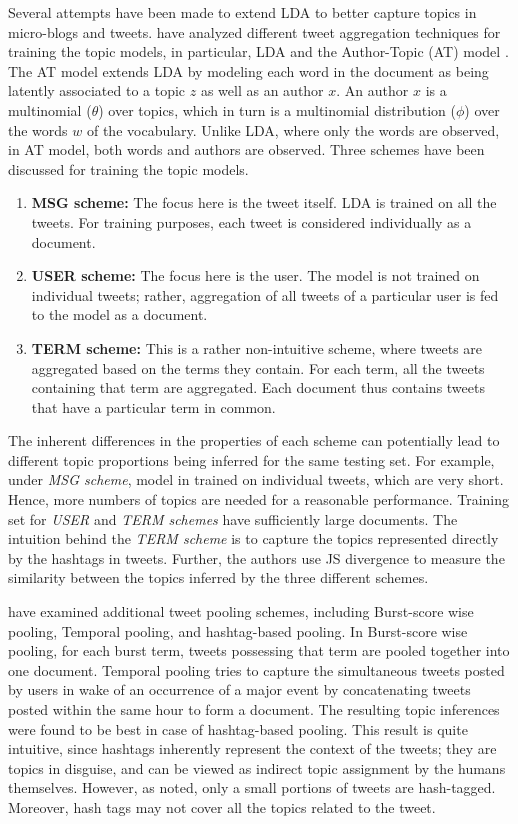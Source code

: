 Several attempts have been made to extend LDA to better capture topics in micro-blogs and tweets. \cite{hong2010empirical} have analyzed different tweet aggregation techniques for training the topic models, in particular, LDA and the Author-Topic (AT) model \cite{rosen2004author}. The AT model extends LDA by modeling each word in the document as being latently associated to a topic $z$ as well as an author $x$. An author $x$ is a multinomial ($\theta$) over topics, which in turn is a multinomial distribution ($\phi$) over the words $w$ of the vocabulary. Unlike LDA, where only the words are observed, in AT model, both words and authors are observed. Three schemes have been discussed for training the topic models.
\begin{enumerate}
\item {\bf MSG scheme:} The focus here is the tweet itself. LDA is trained on all the tweets. For training purposes, each tweet is considered individually as a document.
\item {\bf USER scheme:} The focus here is the user. The model is not trained on individual tweets; rather, aggregation of all tweets of a particular user is fed to the model as a document.
\item {\bf TERM scheme:} This is a rather non-intuitive scheme, where tweets are aggregated based on the terms they contain. For each term, all the tweets containing that term are aggregated. Each document thus contains tweets that have a particular term in common.
\end{enumerate}

The inherent differences in the properties of each scheme can potentially lead to different topic proportions being inferred for the same testing set. For example, under \emph{MSG scheme}, model in trained on individual tweets, which are very short. Hence, more numbers of topics are needed for a reasonable performance. Training set for \emph{USER} and \emph{TERM schemes} have sufficiently large documents. The intuition behind the \emph{TERM scheme} is to capture the topics represented directly by the hashtags in tweets. Further, the authors use JS divergence to measure the similarity between the topics inferred by the three different schemes.

\cite{mehrotra2013improving} have examined additional tweet pooling schemes, including Burst-score wise pooling, Temporal pooling, and hashtag-based pooling. In Burst-score wise pooling, for each burst term, tweets possessing that term are pooled together into one document. Temporal pooling tries to capture the simultaneous tweets posted by users in wake of an occurrence of a major event by concatenating tweets posted within the same hour to form a document. The resulting topic inferences were found to be best in case of hashtag-based pooling. This result is quite intuitive, since hashtags inherently represent the context of the tweets; they are topics in disguise, and can be viewed as indirect topic assignment by the humans themselves. However, as noted, only a small portions of tweets are hash-tagged. Moreover, hash tags may not cover all the topics related to the tweet.

